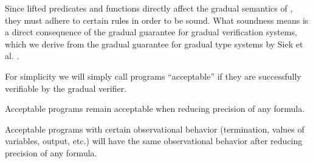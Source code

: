 Since lifted predicates and functions directly affect the gradual semantics of \gvl, they must adhere to certain rules in order to be sound.
What soundness means is a direct consequence of the gradual guarantee for gradual verification systems, which we derive from the gradual guarantee for gradual type systems by Siek et al. \cite{siek2015refined}.

For simplicity we will simply call programs “acceptable” if they are successfully verifiable by the gradual verifier.

\begin{definition}
    \label{grad-guarantee-static}
    Acceptable programs remain acceptable when reducing precision of any formula.
\end{definition}

\begin{definition}
    \label{grad-guarantee-dynamic}
    Acceptable programs with certain observational behavior (termination, values of variables, output, etc.) will have the same observational behavior after reducing precision of any formula.
\end{definition}

\begin{comment}




PROBABLY UNNECESSARY:\\
Because of its generality, we will pursue the approach introduced in section \ref{ssec:wildcard-with-upper} for the remainder of this chapter.
As concretization we chose the semantic version, as it is more flexible than the syntactic one in practice.
For reference, the full definitions:
\begin{align*} 
&\text{Syntax:}\\
&\grad{\phi} ::= \phi ~|~ \withqmGen{\phi}\\
\\
&\text{Concretization:}\\
&\gamma(\phi) = \{~ \phi ~\}     \quad\quad \forall \phi \in \setFormulaA\\
&\gamma(\withqmGen{\phi}) = \{~ \phi' \in \setFormulaA ~|~ \phiImplies{\phi'}{\phi} ~\}\\
&\gamma(\grad{\phi}) = \emptyset    \quad\textit{otherwise}
\end{align*}
\end{comment}
